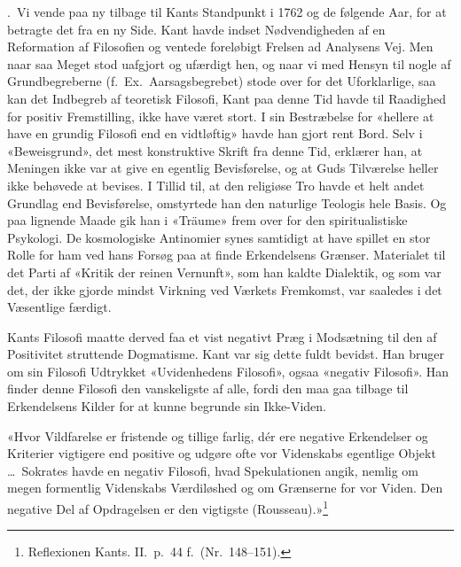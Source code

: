 \documentclass[12pt,a4paper]{article}
\newcommand{\apage}[1]{\marginnote{\footnotesize\textit{[#1]}}}
\begin{document}
.\ Vi vende paa ny tilbage til Kants Standpunkt i 1762 og de
følgende Aar, for at betragte det fra en ny Side. Kant havde indset
Nødvendigheden af en Reformation af Filosofien og ventede foreløbigt
Frelsen ad Analysens Vej. Men naar saa Meget stod uafgjort og ufærdigt
hen, og naar vi med Hensyn til nogle af Grundbegreberne (f.\ Ex.\
Aarsagsbegrebet) stode over for det Uforklarlige, saa kan det Indbegreb
af teoretisk Filosofi, Kant paa denne Tid havde til Raadighed for positiv
Fremstilling, ikke have været stort. I sin Bestræbelse for «hellere at
have en grundig Filosofi end en vidtløftig» havde han gjort rent Bord.
Selv i «Beweisgrund», det mest konstruktive Skrift fra denne Tid,
erklærer han, at Meningen ikke var at give en egentlig Bevisførelse, og
at Guds Tilværelse heller ikke behøvede at bevises. I Tillid til, at den
religiøse Tro havde et helt andet Grundlag end Bevisførelse, omstyrtede
han den naturlige Teologis hele Basis. Og paa lignende Maade gik han i
«Träume» frem over for den spiritualistiske Psykologi. De kosmologiske
Antinomier synes samtidigt at have spillet en stor Rolle for ham ved hans
Forsøg paa at finde Erkendelsens Grænser. Materialet til det Parti af
«Kritik der reinen Vernunft», som han kaldte Dialektik, og som var det,
der ikke gjorde mindst Virkning ved Værkets Fremkomst, var saaledes i det
Væsentlige færdigt.

Kants Filosofi maatte derved faa et vist negativt Præg i Modsætning til
den af Positivitet struttende Dogmatisme. Kant var sig dette fuldt
bevidst. Han bruger om sin Filosofi Udtrykket «Uvidenhedens Filosofi»,
ogsaa «negativ Filosofi». Han finder denne Filosofi den vanskeligste af
alle, fordi den maa gaa tilbage til Erkendelsens Kilder for at kunne
begrunde sin Ikke-Viden.

«Hvor Vildfarelse er fristende og tillige farlig, dér ere negative
Erkendelser og Kriterier vigtigere end positive og udgøre ofte vor
Videnskabs egentlige Objekt \ldots\ Sokrates \apage{36} havde en negativ Filosofi,
hvad Spekulationen angik, nemlig om megen formentlig Videnskabs
Værdiløshed og om Grænserne for vor Viden. Den negative Del af
Opdragelsen er den vigtigste
(Rousseau).»\footnote{Reflexionen Kants. II.\ p.\ 44 f.\ (Nr.\
148--151).}
\end{document}
